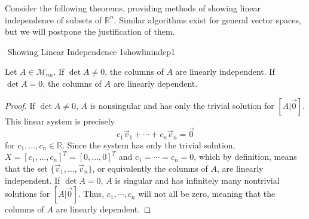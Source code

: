         Consider the following theorems, providing methods of showing linear independence of subsets of \(\mathbb{R}^n\). Similar algorithms exist for general vector spaces, but we will postpone the justification of them.
        \begin{theorem}{\Stop\,\,Showing Linear Independence 1}{showlinindep1}

            Let \(A\in\mathcal{M}_{nn}\). If \(\det A \neq 0\), the columns of \(A\) are linearly independent. If \(\det A = 0\), the columns of \(A\) are linearly dependent.
            \begin{proof}
                If \(\det A\neq 0\), \(A\) is nonsingular and has only the trivial solution for \([A|\vec{0}]\). This linear system is precisely
                \begin{equation*}
                    c_1\vec{v}_1+\cdots+c_n\vec{v}_n=\vec{0}
                \end{equation*}
                for \(c_1,\ldots,c_n\in\mathbb{R}\). Since the system has only the trivial solution, \(X=[c_1,\ldots,c_n]^T=[0,\ldots,0]^T\) and \(c_1=\cdots=c_n=0\), which by definition, means that the set \(\{\vec{v}_1,\ldots,\vec{v}_n\}\), or equivalently the columns of \(A\), are linearly independent. If \(\det A =0\), \(A\) is singular and has infinitely many nontrivial solutions for \([A|\vec{0}]\). Thus, \(c_1,\cdots,c_n\) will not all be zero, meaning that the columns of \(A\) are linearly dependent.
            \end{proof}

        \end{theorem}
        \pagebreak
